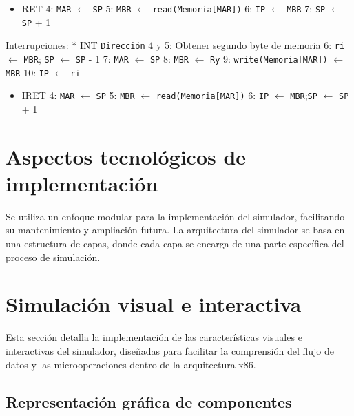 \documentclass[12pt,oneside]{templates/unerthesis}
\providecommand{\tightlist}{%
  \setlength{\itemsep}{0pt}\setlength{\parskip}{0pt}}
\begin{document}
\begin{itemize}
\tightlist
\item
  RET
  4: \texttt{MAR} \(\leftarrow\) \texttt{SP}
  5: \texttt{MBR} \(\leftarrow\) \texttt{read(Memoria{[}MAR{]})}
  6: \texttt{IP} \(\leftarrow\) \texttt{MBR}
  7: \texttt{SP} \(\leftarrow\) \texttt{SP} + 1
\end{itemize}

Interrupciones:
* INT \texttt{Dirección}
4 y 5: Obtener segundo byte de memoria
6: \texttt{ri} \(\leftarrow\) \texttt{MBR}; \texttt{SP} \(\leftarrow\) \texttt{SP} - 1
7: \texttt{MAR} \(\leftarrow\) \texttt{SP}
8: \texttt{MBR} \(\leftarrow\) \texttt{Ry}
9: \texttt{write(Memoria{[}MAR{]})} \(\leftarrow\) \texttt{MBR}
10: \texttt{IP} \(\leftarrow\) \texttt{ri}

\begin{itemize}
\tightlist
\item
  IRET
  4: \texttt{MAR} \(\leftarrow\) \texttt{SP}
  5: \texttt{MBR} \(\leftarrow\) \texttt{read(Memoria{[}MAR{]})}
  6: \texttt{IP} \(\leftarrow\) \texttt{MBR};\texttt{SP} \(\leftarrow\) \texttt{SP} + 1
\end{itemize}

\hypertarget{aspectos-tecnoluxf3gicos-de-implementaciuxf3n}{%
\section{Aspectos tecnológicos de implementación}\label{aspectos-tecnoluxf3gicos-de-implementaciuxf3n}}

Se utiliza un enfoque modular para la implementación del simulador, facilitando su mantenimiento y ampliación futura. La arquitectura del simulador se basa en una estructura de capas, donde cada capa se encarga de una parte específica del proceso de simulación.

\hypertarget{simulaciuxf3n-visual-e-interactiva}{%
\section{Simulación visual e interactiva}\label{simulaciuxf3n-visual-e-interactiva}}

Esta sección detalla la implementación de las características visuales e interactivas del simulador, diseñadas para facilitar la comprensión del flujo de datos y las microoperaciones dentro de la arquitectura x86.

\hypertarget{representaciuxf3n-gruxe1fica-de-componentes}{%
\subsection{Representación gráfica de componentes}\label{representaciuxf3n-gruxe1fica-de-componentes}}
\end{document}
